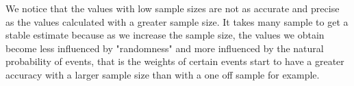 \documentclass[10pt]{article}
\newenvironment{AnswerBox}{\begin{mdframed}[style=simple]}{\end{mdframed}}
\begin{document}
\begin{AnswerBox}%

We notice that the values with low sample sizes are not as accurate and precise as the values calculated with a greater sample size. It takes many sample to get a stable estimate because as we increase the sample size, the values we obtain become less influenced by "randomness" and more influenced by the natural probability of events, that is the weights of certain events start to have a greater accuracy with a larger sample size than with a one off sample for example.

    
\end{AnswerBox}%
\end{document}

